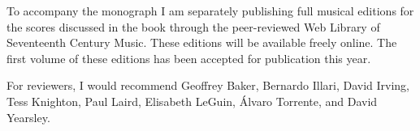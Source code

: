 \documentclass{vcbook-proposal}
\begin{document}
To accompany the monograph I am separately publishing full musical editions for
the scores discussed in the book through the peer-reviewed Web Library of
Seventeenth Century Music.%
    \Autocite{Cashner:WLSCM32}
These editions will be available freely online.
The first volume of these editions has been accepted for publication this year.

For reviewers, I would recommend Geoffrey Baker, Bernardo Illari, David Irving,
Tess Knighton, Paul Laird, Elisabeth LeGuin, Álvaro Torrente, and David
Yearsley.
\end{document}
